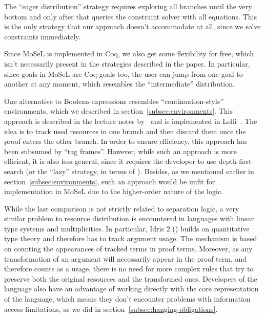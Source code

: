   The ``eager distribution'' strategy requires exploring all branches until the very bottom and only after that queries the constraint solver with all equations.
  This is the only strategy that our approach doesn't accommodate at all, since we solve constraints immediately.

  Since MoSeL is implemented in Coq, we also get some flexibility for free, which isn't necessarily present in the strategies described in the paper.
  In particular, since goals in MoSeL are Coq goals too, the user can jump from one goal to another at any moment, which resembles the ``intermediate'' distribution.

One alternative to Boolean-expressions resembles ``continuation-style'' environments, which we described in section~\ref{subsec:environments}.
  This approach is described in the lecture notes by~\citet{pfenningLogicProgrammingLecture2007} and is implemented in Lolli~\cite{LolliLinearLogic}.
  The idea is to track used resources in one branch and then discard them once the proof enters the other branch.
  In order to ensure efficiency, this approach has been subsumed by ``tag frames''\cite{hodasTagFrameSystemResource2002, lopezImplementingEfficientResource2004}.
  However, while such an approach is more efficient, it is also less general, since it requires the developer to use depth-first search (or the ``lazy'' strategy, in terms of \citet{harlandResourceDistributionBooleanConstraints2003}).
  Besides, as we mentioned earlier in section~\ref{subsec:environments}, such an approach would be unfit for implementation in MoSeL due to the higher-order nature of the logic.

While the last comparison is not strictly related to separation logic, a very similar problem to resource distribution is encountered in languages with linear type systems and multiplicities.
  In particular, Idris 2 (\cite{MultiplicitiesIdris2Documentation}) builds on quantitative type theory and therefore has to track argument usage.
  The mechanism is based on counting the appearances of tracked terms in proof terms.
  Moreover, as any transformation of an argument will necessarily appear in the proof term, and therefore counts as a usage, there is no need for more complex rules that try to preserve both the original resources and the transformed ones.
  Developers of the language also have an advantage of working directly with the core representation of the language, which means they don't encounter problems with information access limitations, as we did in section~\ref{subsec:hanging-obligations}.

